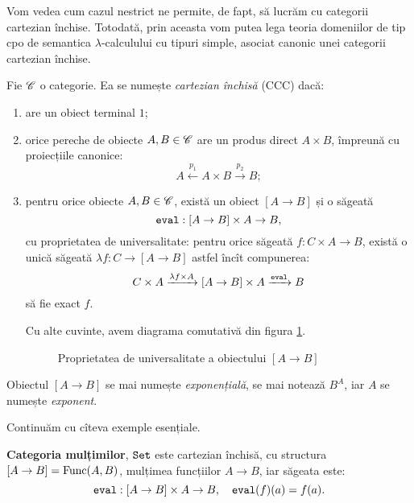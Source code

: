 \documentclass[12pt, a4paper]{article}
\begin{document}
Vom vedea cum cazul nestrict ne permite, de fapt, să lucrăm cu categorii
cartezian închise. Totodată, prin aceasta vom putea lega teoria domeniilor
de tip cpo de semantica $ \lambda $-calculului cu tipuri simple, asociat
canonic unei categorii cartezian închise.

\begin{definition}\label{def:ccc}
  Fie $ \mathscr{C} $ o categorie. Ea se numește \emph{cartezian închisă} (CCC)
  dacă:
  \begin{enumerate}[(CCC1)]
  \item are un obiect terminal $ 1 $;
  \item orice pereche de obiecte $ A, B \in \mathscr{C} $ are un produs direct
    $ A \times B $, împreună cu proiecțiile canonice:
    \[
      A \xleftarrow{p_1} A \times B \xrightarrow{p_2} B;
    \]
  \item pentru orice obiecte $ A, B \in \mathscr{C} $, există un obiect
    $ [A \to B] $ și o săgeată
    \[
      \texttt{eval} : [A \to B] \times A \to B,
    \]
    cu proprietatea de universalitate: pentru orice săgeată $ f : C \times A \to B $,
    există o unică săgeată $ \lambda f : C \to [A \to B] $ astfel încît
    compunerea:
    \[
      C \times A \xrightarrow{\lambda f \times A} [A \to B] \times A \xrightarrow{\texttt{eval}} B
    \]
    să fie exact $ f $.

    Cu alte cuvinte, avem diagrama comutativă din figura \ref{fig:ccc}.
    \begin{figure}[!htbp]
      \centerline{
        \xymatrixcolsep{50px}
        \xymatrixrowsep{50px}
      }
      \caption{Proprietatea de universalitate a obiectului $ [A \to B] $}
      \label{fig:ccc}
    \end{figure}
  \end{enumerate}

  Obiectul $ [A \to B] $ se mai numește \emph{exponențială}, se mai notează $ B^A $,
  iar $ A $ se numește \emph{exponent}.
\end{definition}

Continuăm cu cîteva exemple esențiale.

\textbf{Categoria mulțimilor}, $ \texttt{Set} $ este cartezian închisă, cu structura
$ [A \to B] = \mathrm{Func}(A, B) $, mulțimea funcțiilor $ A \to B $, iar săgeata
 este:
\[
  \texttt{eval} : [A \to B] \times A \to B, \quad \texttt{eval}(f)(a) = f(a).
\]
\end{document}
